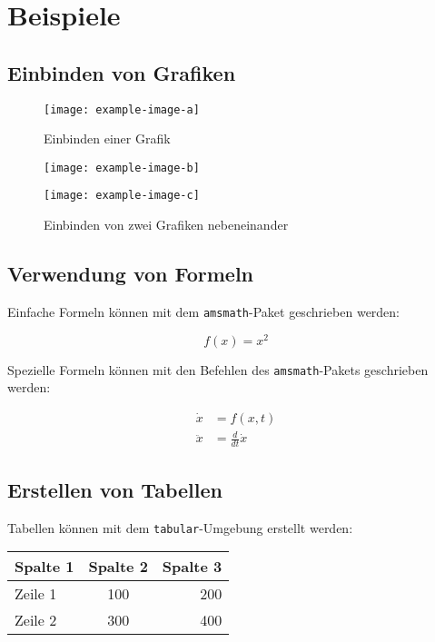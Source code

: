 \chapter{Beispiele}

\section{Einbinden von Grafiken}

\begin{figure}[hbtp]
\centering
\texttt{[image: example-image-a]}
\caption{Einbinden einer Grafik}
\end{figure}

\begin{figure}[hbtp]
\centering
\begin{minipage}{0.45\textwidth}
\texttt{[image: example-image-b]}
\end{minipage}
\hspace{0.05\textwidth}
\begin{minipage}{0.45\textwidth}
\texttt{[image: example-image-c]}
\end{minipage}
\caption{Einbinden von zwei Grafiken nebeneinander}
\end{figure}

\section{Verwendung von Formeln}

Einfache Formeln können mit dem \texttt{amsmath}-Paket geschrieben werden:

\begin{equation}
f(x) = x^2
\end{equation}

Spezielle Formeln können mit den Befehlen des \texttt{amsmath}-Pakets geschrieben werden:

\begin{align}
\dot{x} &= f(x,t) \\
\ddot{x} &= \frac{d}{dt} \dot{x}
\end{align}

\section{Erstellen von Tabellen}

Tabellen können mit dem \texttt{tabular}-Umgebung erstellt werden:

\begin{table}[!hbtp]
\begin{tabular}{|l|c|r|}
\hline
Spalte 1 & Spalte 2 & Spalte 3 \\
\hline
Zeile 1 & 100 & 200 \\
Zeile 2 & 300 & 400 \\
\hline
\end{tabular}
\end{table}

